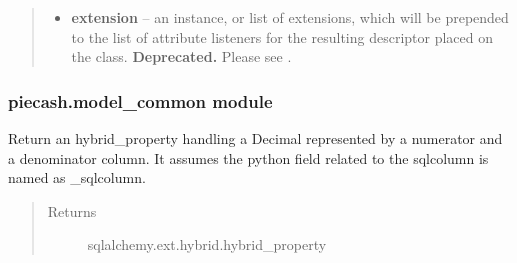 \documentclass[letterpaper,10pt,english]{sphinxmanual}
\begin{document}
\begin{fulllineitems}
\begin{quote}
\begin{description}
\begin{itemize}


\item {} 
\textbf{extension} -- an  instance,
or list of extensions, which will be prepended to the list of
attribute listeners for the resulting descriptor placed on the
class.  \textbf{Deprecated.}  Please see .

\end{itemize}

\end{description}\end{quote}

\end{fulllineitems}



\subsubsection{piecash.model\_common module}
\label{api/piecash.model_common::doc}\label{api/piecash.model_common:piecash-model-common-module}\label{api/piecash.model_common:module-piecash.model_common}

\begin{fulllineitems}
\label{api/piecash.model_common:piecash.model_common.hybrid_property_gncnumeric}
Return an hybrid\_property handling a Decimal represented by a numerator and a denominator column.
It assumes the python field related to the sqlcolumn is named as \_sqlcolumn.
\begin{quote}\begin{description}
\item[{Returns}] \leavevmode
sqlalchemy.ext.hybrid.hybrid\_property

\end{description}\end{quote}

\end{fulllineitems}

\end{document}

